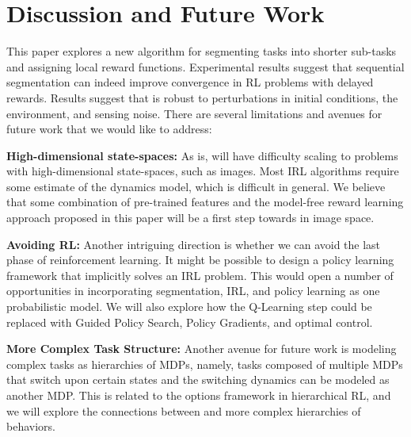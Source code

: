 \section{Discussion and Future Work}
This paper explores a new algorithm \hirl for segmenting tasks into shorter sub-tasks and assigning local reward functions.
Experimental results suggest that sequential segmentation can indeed improve convergence in RL problems with delayed rewards.
Results suggest that \hirl is robust to perturbations in initial conditions, the environment, and sensing noise.
There are several limitations and  avenues for future work that we would like to address:

\vspace{0.25em}\noindent \textbf{High-dimensional state-spaces: } As is, \hirl will have difficulty scaling to problems with high-dimensional state-spaces, such as images. Most IRL algorithms require some estimate of the dynamics model, which is difficult in general. We believe that some combination of pre-trained features and the model-free reward learning approach proposed in this paper will be a first step towards \hirl in image space.

\vspace{0.25em}\noindent \textbf{Avoiding RL: } Another intriguing direction is whether we can avoid the last phase  of reinforcement learning. It might be possible to design a policy learning framework that implicitly solves an IRL problem. This would open a number of opportunities in incorporating segmentation, IRL, and policy learning as one probabilistic model.
We will also explore how the Q-Learning step could be replaced with Guided Policy Search, Policy Gradients, and optimal control.


\vspace{0.25em}\noindent \textbf{More Complex Task Structure: } Another avenue for future work is modeling complex tasks as hierarchies of MDPs, namely, tasks composed of multiple MDPs that switch upon certain states and the switching dynamics can be modeled as another MDP. This is related to the options framework in hierarchical RL, and we will explore the connections between \hirl and more complex hierarchies of behaviors.